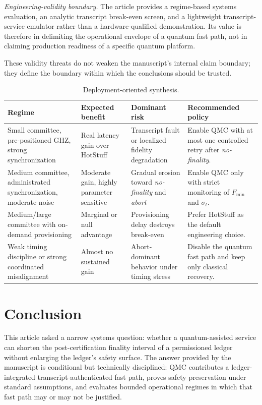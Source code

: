 \documentclass{ieeeaccess}
\begin{document}
\textit{Engineering-validity boundary.} The article provides a regime-based systems evaluation, an analytic transcript break-even screen, and a lightweight transcript-service emulator rather than a hardware-qualified demonstration. Its value is therefore in delimiting the operational envelope of a quantum fast path, not in claiming production readiness of a specific quantum platform.

These validity threats do not weaken the manuscript's internal claim boundary; they define the boundary within which the conclusions should be trusted.

\begin{table}[!t]
\caption{Deployment-oriented synthesis.}
\label{tab:deployment}
\centering
\scriptsize
\setlength{\tabcolsep}{4pt}
\renewcommand{\arraystretch}{1.14}
\begin{tabularx}{\textwidth}{p{3.0cm}p{2.5cm}p{2.8cm}Y}
\toprule
\textbf{Regime} & \textbf{Expected benefit} & \textbf{Dominant risk} & \textbf{Recommended policy} \\
\midrule
Small committee, pre-positioned GHZ, strong synchronization & Real latency gain over HotStuff & Transcript fault or localized fidelity degradation & Enable QMC with at most one controlled retry after \textit{no-finality}. \\
Medium committee, administrated synchronization, moderate noise & Moderate gain, highly parameter sensitive & Gradual erosion toward \textit{no-finality} and \textit{abort} & Enable QMC only with strict monitoring of $F_{\min}$ and $\sigma_t$. \\
Medium/large committee with on-demand provisioning & Marginal or null advantage & Provisioning delay destroys break-even & Prefer HotStuff as the default engineering choice. \\
Weak timing discipline or strong coordinated misalignment & Almost no sustained gain & Abort-dominant behavior under timing stress & Disable the quantum fast path and keep only classical recovery. \\
\bottomrule
\end{tabularx}
\end{table}

\section{Conclusion}
\label{sec:conclusion}
This article asked a narrow systems question: whether a quantum-assisted service can shorten the post-certification finality interval of a permissioned ledger without enlarging the ledger's safety surface. The answer provided by the manuscript is conditional but technically disciplined: QMC contributes a ledger-integrated transcript-authenticated fast path, proves safety preservation under standard assumptions, and evaluates bounded operational regimes in which that fast path may or may not be justified.
\end{document}
